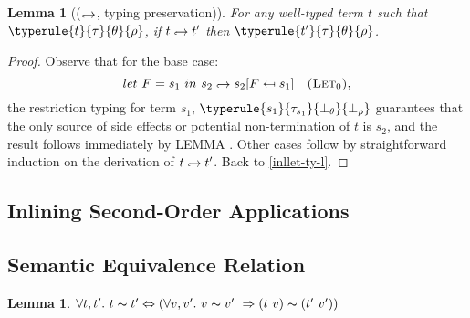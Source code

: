 \documentclass[a4paper,11pt,oneside]{article}
\theoremstyle{plain}
\newtheorem{lemma}[definition]{Lemma}
\newcommand{\tmapp}[2]{(#1 ~ #2)}
\newcommand{\tmlet}[3]{let~#1=#2~in~#3}
\newcommand{\tmsbst}[3]{#1 [#2 \mapsfrom #3] }
\newcommand{\eqv}[1]{#1 \thicksim #1'}
\newcommand{\hookdownarrow}{\mathrel{\rotatebox[origin=c]{180}{$\hookleftarrow$}}}
\newcommand{\inlletarr}{\hookdownarrow}
\newcommand{\inllet}[2]{#1 \hookdownarrow #2}
\begin{document}
	\begin{lemma}[($\inlletarr$, typing preservation)] For any well-typed term $t$
 such that \mbox{$\typerule{t}{\tau}{\theta}{\rho}$}, if $\inllet{t}{t'}$
 then $\typerule{t'}{\tau}{\theta}{\rho}$.
 \label{inllet-ty-p}
\end{lemma}

\begin{proof} Observe that for the base case:
$$\tmlet{F}{s_1}{s_2} \hookdownarrow \tmsbst{s_2}{F}{s_1} \quad \textsc{(Let$_0$)},$$ the restriction typing for term $s_1$, $\typerule{s_1}{\tau_{s_1}}{\bot_\theta}{\bot_\rho}$ guarantees that the only source of side effects or potential non-termination of $t$ is $s_2$, and the result follows immediately by LEMMA \label{TODO:typ-subst-lemma}. Other cases follow by straightforward induction on 
the derivation of $\inllet{t}{t'}$. Back to \ref{inllet-ty-l}.
\end{proof}
	
	\subsection{Inlining Second-Order Applications}



	\subsection{Semantic Equivalence Relation}
	\begin{lemma}
		$\forall t,t'.~ \eqv{t} \Leftrightarrow 
			(\forall v, v'.~\eqv{v}~\Rightarrow
			\tmapp{t}{v} \thicksim \tmapp{t'}{v'})$
	\label{equiv-def-p}
	\end{lemma}
\end{document}
